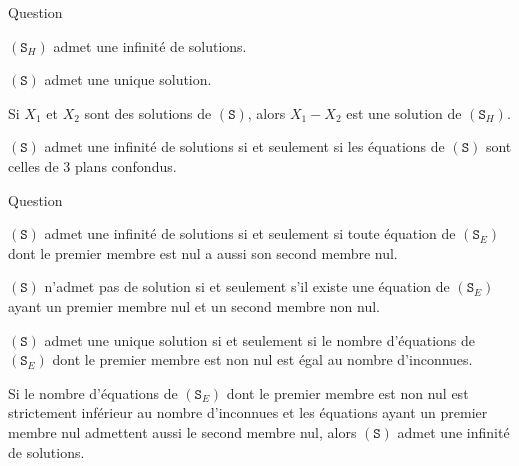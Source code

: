 \begin{multi}[multiple,feedback=
{\((\mathtt{S}_H)\) admet au moins le zéro de l'espace comme solution, mais n'admet pas nécessairement une infinité de solutions. Les équations de \((\mathtt{S})\) étant celles de \(3\) plans, \(4\) cas sont possibles :
\begin{enumerate}
\item[-] Les \(3\) plans sont confondus, dans ce cas, \((\mathtt{S})\) admet une infinité de solutions.
\item[-] Les \(3\) plans se coupent en une droite, dans ce cas, \((\mathtt{S})\) admet une infinité de solutions.
\item[-] Les \(3\) plans se coupent en un point, dans ce cas, \((\mathtt{S})\) admet une unique solution.
\item[-] L'intersection des  \(3\) plans est vide, dans ce cas, \((\mathtt{S})\) n'admet pas de solution.
\end{enumerate}
}]{Question}
    \item \((\mathtt{S}_H)\) admet une infinité de solutions.
    \item \((\mathtt{S})\) admet une unique solution.
    \item* Si \(X_1\) et \(X_2\) sont des solutions de \((\mathtt{S})\), alors \(X_1-X_2\) est une solution de \((\mathtt{S}_H)\).
    \item \((\mathtt{S})\) admet une infinité de solutions si et seulement si les équations de \((\mathtt{S})\) sont celles de \(3\) plans confondus.
\end{multi}


\begin{multi}[multiple,feedback=
{D'après la méthode du pivot de Gauss, \((\mathtt{S})\) admet une solution si et seulement si toute équation de \((\mathtt{S}_E)\) dont le premier membre est nul a aussi son second membre nul.
}]{Question}
    \item \((\mathtt{S})\) admet une infinité de solutions si et seulement si toute équation de \((\mathtt{S}_E)\) dont le premier membre est nul a aussi son second membre nul.
    \item* \((\mathtt{S})\) n'admet pas de solution si et seulement s'il existe une équation de \((\mathtt{S}_E)\) ayant un premier membre nul et un second membre non nul.
    \item \((\mathtt{S})\) admet une unique solution si et seulement si le nombre d'équations de \((\mathtt{S}_E)\) dont le premier membre est non nul est égal au nombre d'inconnues.
    \item* Si le nombre d'équations de \((\mathtt{S}_E)\) dont le premier membre est non nul est strictement inférieur au nombre d'inconnues et les équations ayant un premier membre nul admettent aussi le second membre nul, alors \((\mathtt{S})\) admet une infinité de solutions.
\end{multi}


